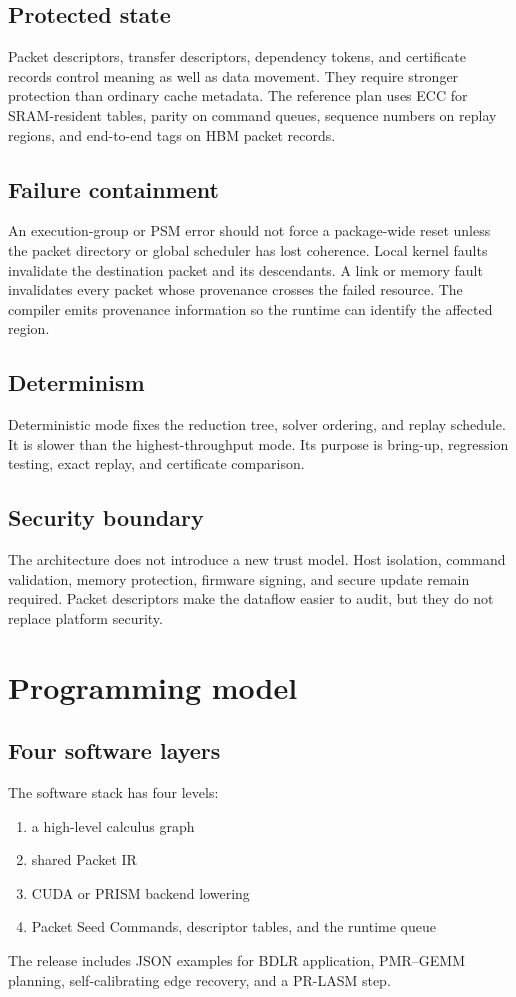 \documentclass[11pt,oneside,openany]{book}
\theoremstyle{remark}
\begin{document}
\section{Protected state}
Packet descriptors, transfer descriptors, dependency tokens, and certificate records control meaning as well as data movement. They require stronger protection than ordinary cache metadata. The reference plan uses ECC for SRAM-resident tables, parity on command queues, sequence numbers on replay regions, and end-to-end tags on HBM packet records.

\section{Failure containment}
An execution-group or PSM error should not force a package-wide reset unless the packet directory or global scheduler has lost coherence. Local kernel faults invalidate the destination packet and its descendants. A link or memory fault invalidates every packet whose provenance crosses the failed resource. The compiler emits provenance information so the runtime can identify the affected region.

\section{Determinism}
Deterministic mode fixes the reduction tree, solver ordering, and replay schedule. It is slower than the highest-throughput mode. Its purpose is bring-up, regression testing, exact replay, and certificate comparison.

\section{Security boundary}
The architecture does not introduce a new trust model. Host isolation, command validation, memory protection, firmware signing, and secure update remain required. Packet descriptors make the dataflow easier to audit, but they do not replace platform security.

\chapter{Programming model}

\section{Four software layers}
The software stack has four levels:
\begin{enumerate}
\item a high-level calculus graph
\item shared Packet IR
\item CUDA or PRISM backend lowering
\item Packet Seed Commands, descriptor tables, and the runtime queue
\end{enumerate}
The release includes JSON examples for BDLR application, PMR--GEMM planning, self-calibrating edge recovery, and a PR-LASM step.
\end{document}
